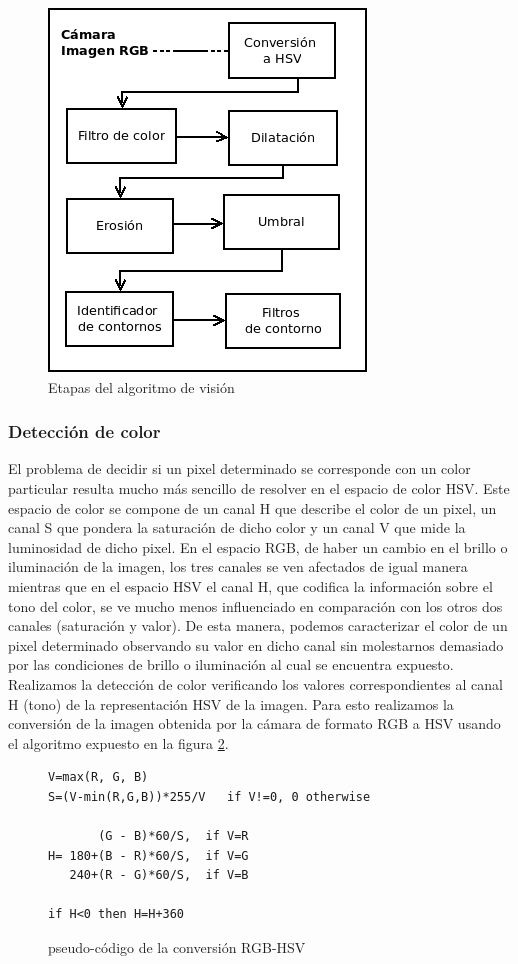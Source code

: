 \begin{figure}[tpb]
\begin{center}
  \includegraphics[scale=0.6]{figuras/vision-flow.png}
\end{center}
  \caption{Etapas del algoritmo de visión}
  \label{fig:alg_steps}
\end{figure}


\subsubsection{\label{sec:color} Detección de color}
El problema de decidir si un pixel determinado se corresponde con un 
color particular resulta mucho más sencillo de resolver en el espacio 
de color HSV. Este espacio de color se compone de un canal H que 
describe el color de un pixel, un canal S que pondera la saturación de 
dicho color y un canal V que mide la luminosidad de dicho pixel. En el espacio RGB, de haber un cambio en el brillo o 
iluminación de la imagen, los tres canales se ven afectados de igual 
manera mientras que en el espacio HSV el canal H, que codifica la 
información sobre el tono del color, se ve mucho menos influenciado en 
comparación con los otros dos canales (saturación y valor). De esta 
manera, podemos caracterizar el color de un pixel determinado 
observando su valor en dicho canal sin molestarnos demasiado por las condiciones de brillo o iluminación al cual se encuentra expuesto.
\\ \indent Realizamos la detección de color verificando los valores correspondientes al canal H (tono) de la representación HSV de la imagen. Para esto realizamos la conversión de la imagen obtenida por la cámara  de formato RGB a HSV usando el algoritmo expuesto en la figura \ref{code:hsv}.
\begin{figure}[tpb]
\begin{verbatim}
V=max(R, G, B)
S=(V-min(R,G,B))*255/V   if V!=0, 0 otherwise

       (G - B)*60/S,  if V=R
H= 180+(B - R)*60/S,  if V=G
   240+(R - G)*60/S,  if V=B

if H<0 then H=H+360
\end{verbatim}
\caption{\label{code:hsv}pseudo-código de la conversión RGB-HSV}
\end{figure}

